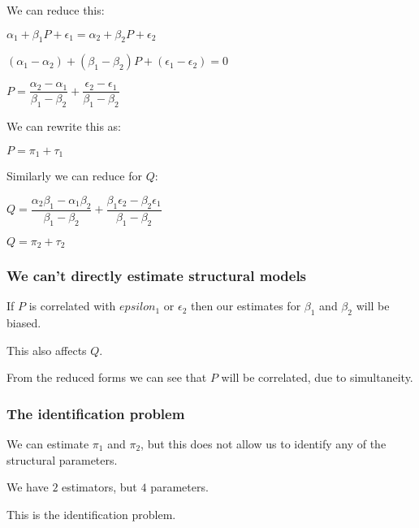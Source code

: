 We can reduce this:

\(\alpha_1 + \beta_1 P + \epsilon_1 =\alpha_2 + \beta_2 P + \epsilon_2 \)

\((\alpha_1 -\alpha_2 )+ (\beta_1 -\beta_2 )P + (\epsilon_1 -\epsilon_2 )=0\)

\(P =\dfrac{\alpha_2-\alpha_1 }{\beta_1-\beta_2}+\dfrac{\epsilon_2-\epsilon_1 }{\beta_1-\beta_2}\)

We can rewrite this as:

\(P=\pi_1 + \tau_1 \)

Similarly we can reduce for \(Q\):

\(Q =\dfrac{\alpha_2\beta_1-\alpha_1\beta_2 }{\beta_1-\beta_2}+\dfrac{\beta_1\epsilon_2 -\beta_2\epsilon_1}{\beta_1-\beta_2}\)

\(Q= \pi_2 + \tau_2\)

\subsubsection{We can't directly estimate structural models}

If \(P\) is correlated with \(epsilon_1\) or \(\epsilon_2\) then our estimates for \(\beta_1\) and \(\beta_2\) will be biased.

This also affects \(Q\).

From the reduced forms we can see that \(P\) will be correlated, due to simultaneity.

\subsubsection{The identification problem}

We can estimate \(\pi_1 \) and \(\pi_2\), but this does not allow us to identify any of the structural parameters.

We have \(2\) estimators, but \(4\) parameters.

This is the identification problem.

